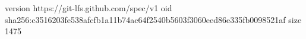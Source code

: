version https://git-lfs.github.com/spec/v1
oid sha256:c3516203fe538afcfb1a11b74ac64f2540b5603f3060eed86e335fb0098521af
size 1475
